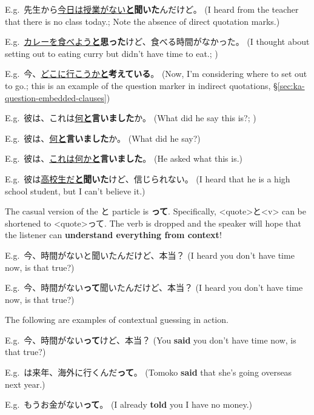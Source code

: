 \documentclass[../nihongo-gakushuu-kyouzai.tex]{subfiles}
\begin{document}
E.g.\ 先生から\ul{今日は授業がない\textbf{と}}\textbf{聞いた}んだけど。 (I heard from the teacher that there is no class today.; Note the absence of direct quotation marks.)

E.g.\ \ul{カレーを食べよう\textbf{と}}\textbf{思った}けど、食べる時間がなかった。 (I thought about setting out to eating curry but didn't have time to eat.; )

E.g.\ 今、\ul{どこに行こうか\textbf{と}}\textbf{考えている}。 (Now, I'm considering where to set out to go.; this is an example of the question marker in indirect quotations, \S\ref{sec:ka-question-embedded-clauses})

E.g.\ 彼は、これは\ul{何\textbf{と}}\textbf{言いました}か。 (What did he say this is?; )

E.g.\ 彼は、\ul{何\textbf{と}}\textbf{言いました}か。 (What did he say?)

E.g.\ 彼は、\ul{これは何か\textbf{と}}\textbf{言いました}。 (He asked what this is.)

E.g.\ 彼は\ul{高校生だ\textbf{と}}\textbf{聞いた}けど、信じられない。 (I heard that he is a high school student, but I can't believe it.)

The casual version of the と particle is \textbf{って}. Specifically, <quote>と<v> can be shortened to <quote>って. The verb is dropped and the speaker will hope that the listener can \textbf{understand everything from context}! 

E.g.\ 今、時間がないと聞いたんだけど、本当？ (I heard you don't have time now, is that true?)

E.g.\ 今、時間がない\textbf{って}聞いたんだけど、本当？ (I heard you don't have time now, is that true?)

The following are examples of contextual guessing in action. 

E.g.\ 今、時間がない\textbf{って}けど、本当？ (You \textbf{said} you don't have time now, is that true?)

E.g.\ は来年、海外に行くんだ\textbf{って}。 (Tomoko \textbf{said} that she's going overseas next year.)

E.g.\ もうお金がない\textbf{って}。 (I already \textbf{told} you I have no money.)
\end{document}
